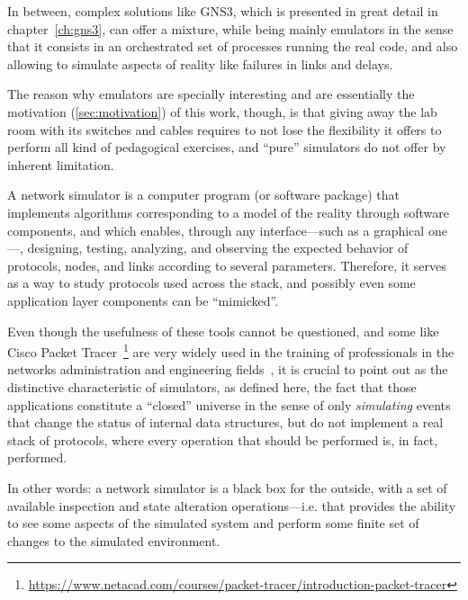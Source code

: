 In between, complex solutions like GNS3, which is presented in great detail in chapter~\ref{ch:gns3}, can offer a mixture, while being mainly emulators in the sense that it consists in an orchestrated set of processes running the real code, and also allowing to simulate aspects of reality like failures in links and delays.

The reason why emulators are specially interesting and are essentially the motivation (\ref{sec:motivation}) of this work, though, is that giving away the lab room with its switches and cables requires to not lose the flexibility it offers to perform all kind of pedagogical exercises, and ``pure'' simulators do not offer by inherent limitation.

A network simulator is a computer program (or software package) that implements algorithms corresponding to a model of the reality through software components, and which enables, through any interface---such as a graphical one---, designing, testing, analyzing, and observing the expected behavior of protocols, nodes, and links according to several parameters. Therefore, it serves as a way to study protocols used across the stack, and possibly even some application layer components can be ``mimicked''.

Even though the usefulness of these tools cannot be questioned, and some like Cisco Packet Tracer~\footnote{\url{https://www.netacad.com/courses/packet-tracer/introduction-packet-tracer}} are very widely used in the training of professionals in the networks administration and engineering fields~\cite{rolepackettracer}, it is crucial to point out as the distinctive characteristic of simulators, as defined here, the fact that those applications constitute a ``closed'' universe in the sense of only \emph{simulating} events that change the status of internal data structures, but do not implement a real stack of protocols, where every operation that should be performed is, in fact, performed. %

In other words: a network simulator is a black box for the outside, with a set of available inspection and state alteration operations---i.e. that provides the ability to see some aspects of the simulated system and perform some finite set of changes to the simulated environment.

